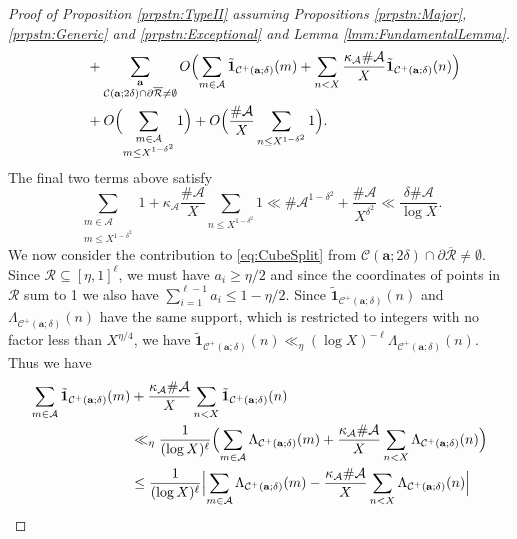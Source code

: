 \documentclass[10pt]{amsart}
\theoremstyle{plain}
\numberwithin{sblmm}{thrm}
\numberwithin{equation}{section}
\begin{document}
\begin{proof}[Proof of Proposition \ref{prpstn:TypeII} assuming Propositions \ref{prpstn:Major}, \ref{prpstn:Generic} and \ref{prpstn:Exceptional} and  Lemma \ref{lmm:FundamentalLemma}]
\begin{align}
&\qquad+\sum_{\substack{\mathbf{a}\\ \mathcal{C}(\mathbf{a};2\delta)\cap\partial\overline{\mathcal{R}}\ne\emptyset} }O\Bigl(\sum_{m\in\mathcal{A}}\tilde{\mathbf{1}}_{\mathcal{C}^+(\mathbf{a};\delta)}(m)+\sum_{n<X}\frac{\kappa_\mathcal{A}\#\mathcal{A}}{X}\tilde{\mathbf{1}}_{\mathcal{C}^+(\mathbf{a};\delta)}(n)\Bigr)\nonumber\\
&\qquad + O\Bigl(\sum_{\substack{m\in\mathcal{A}\\ m\le X^{1-\delta^2}}}1\Bigr)+O\Bigl(\frac{\#\mathcal{A}}{X}\sum_{n\le X^{1-\delta^2}}1\Bigr).
\label{eq:CubeSplit}
\end{align}
The final two terms above satisfy
\begin{equation}
\sum_{\substack{m\in\mathcal{A}\\ m\le X^{1-\delta^2}}}1+\kappa_{\mathcal{A}}\frac{\#\mathcal{A}}{X}\sum_{n\le X^{1-\delta^2}}1\ll \#\mathcal{A}^{1-\delta^2}+\frac{\#\mathcal{A}}{X^{\delta^2}}\ll \frac{\delta\#\mathcal{A}}{\log{X}}.
\label{eq:TrivialTerms}
\end{equation}
We now consider the contribution to \eqref{eq:CubeSplit} from $\mathcal{C}(\mathbf{a};2\delta)\cap\partial\overline{\mathcal{R}}\ne\emptyset$. Since $\mathcal{R}\subseteq[\eta,1]^\ell$, we must have $a_i\ge \eta/2$ and since the coordinates of points in $\mathcal{R}$ sum to 1 we also have $\sum_{i=1}^{\ell-1}a_i\le 1-\eta/2$. Since $\tilde{\mathbf{1}}_{\mathcal{C}^+(\mathbf{a};\delta)}(n)$ and $\Lambda_{\mathcal{C}^+(\mathbf{a};\delta)}(n)$ have the same support, which is restricted to integers with no factor less than $X^{\eta/4}$, we have $\tilde{\mathbf{1}}_{\mathcal{C}^+(\mathbf{a};\delta)}(n)\ll_\eta (\log{X})^{-\ell} \Lambda_{\mathcal{C}^+(\mathbf{a};\delta)}(n)$. Thus we have
\begin{align}
\sum_{m\in\mathcal{A}}\tilde{\mathbf{1}}_{\mathcal{C}^+(\mathbf{a};\delta)}(m)&+\frac{\kappa_\mathcal{A}\#\mathcal{A}}{X}\sum_{n<X}\tilde{\mathbf{1}}_{\mathcal{C}^+(\mathbf{a};\delta)}(n)\nonumber\\
&\ll_\eta \frac{1}{(\log{X})^\ell}\Bigl( \sum_{m\in\mathcal{A}}\Lambda_{\mathcal{C}^+(\mathbf{a};\delta)}(m)+\frac{\kappa_\mathcal{A}\#\mathcal{A}}{X}\sum_{n<X}\Lambda_{\mathcal{C}^+(\mathbf{a};\delta)}(n)\Bigr)\nonumber\\
&\le \frac{1}{(\log{X})^\ell}\Bigl|\sum_{m\in\mathcal{A}}\Lambda_{\mathcal{C}^+(\mathbf{a};\delta)}(m)-\frac{\kappa_\mathcal{A}\#\mathcal{A}}{X}\sum_{n<X}\Lambda_{\mathcal{C}^+(\mathbf{a};\delta)}(n)\Bigr|\nonumber\\

\end{align}
\end{proof}
\end{document}
